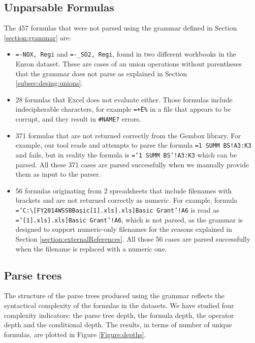 \documentclass[times]{smrauth}
\begin{document}
\subsection{Unparsable Formulas}
\label{subsection:unparsableFormulas}
The 457 formulas that were not parsed using the grammar defined in Section \ref{section:grammar} are:

\begin{itemize}
	\item \texttt{=-NOX, Regi} and \texttt{=-_SO2, Regi}, found in two different workbooks in the Enron dataset. These are cases of an union operations without parentheses that the grammar does not parse as explained in Section \ref{subsec:desing:unions}.
	\item 28 formulas that Excel does not evaluate either. Those formulas include indecipherable characters, for example \texttt{=+Ë\%} in a file that appears to be corrupt, and they result in \texttt{\#NAME?} errors.
	\item 371 formulas that are not returned correctly from the Gembox library. For example, our tool reads and attempts to parse the formula \texttt{=1 SUMM BS!A3:K3} and fails, but in reality the formula is \texttt{='1 SUMM BS'!A3:K3} which can be parsed. All these 371 cases are parsed successfully when we manually provide them as input to the parser.
	\item 56 formulas originating from 2 spreadsheets that include filenames with brackets and are not returned correctly as numeric. For example, formula \texttt{='C:\textbackslash[FY2014WSSBBasic[1].xls].xls]Basic Grant'!A6} is read as \texttt{='[1].xls].xls]Basic Grant'!A6}, which is not parsed, as the grammar is designed to support numeric-only filenames for the reasons explained in Section \ref{section:externalReferences}. All those 56 cases are parsed successfully when the filename is replaced with a numeric one.
\end{itemize}

\subsection{Parse trees}

The structure of the parse trees produced using the grammar reflects the syntactical complexity of the formulas in the datasets. We have studied four complexity indicators: the parse tree depth, the formula depth, the operator depth and the conditional depth. The results, in terms of number of unique formulas, are plotted in Figure \ref{Figure:depths}.
\end{document}
